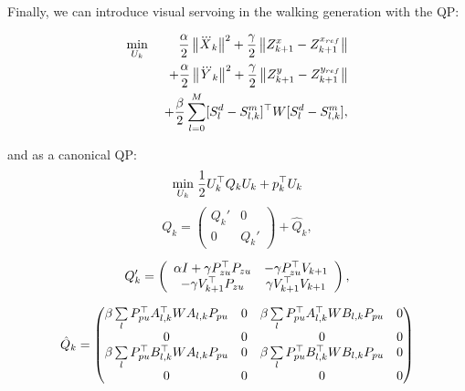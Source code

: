 Finally, we can introduce visual servoing in the walking generation with the QP:

\begin{eqnarray*}
\nonumber
 \min_{U_k} \; && \dfrac{\alpha}{2} \left\| \dddot{X}_k \right\|^2
 + \dfrac{\gamma}{2} \left\| Z_{k+1}^x - Z_{k+1}^{x_{ref}} \right\| \\
 \nonumber
 && + \dfrac{\alpha}{2} \left\| \dddot{Y}_k \right\|^2
 + \dfrac{\gamma}{2} \left\| Z_{k+1}^y - Z_{k+1}^{y_{ref}} \right\| \\
 \nonumber
 && + \dfrac{\beta}{2} \sum\limits_{l=0}^{M}  [S^d_{l}- S^m_{l,k}]^{\top} W [S^d_{l} - S^m_{l,k}],
\end{eqnarray*}

and as a canonical QP:
{\small
\begin{equation*}
\underset{U_k}{\min} \; \dfrac{1}{2} U_k^{\top} Q_k U_k + p_k^{\top} U_k
\end{equation*}
}
{\small
{}
\begin{equation*}
Q_k = \left( \begin{array}{cc}
Q_k' & 0 \\
0 & Q_k'
\end{array}
 \right) + \hat{Q}_k,
\end{equation*}
}

{\scriptsize
\begin{equation*}
 Q_k' = \left(
 \begin{array}{cc}
 \alpha I + \gamma P^{\top}_{zu}P_{zu} & - \gamma P^{\top}_{zu}V_{k+1} \\
 -\gamma V^{\top}_{k+1} P_{zu} & \gamma V^{\top}_{k+1} V_{k+1}
 \end{array}
 \right),
\end{equation*}
}

{\scriptsize
\begin{equation*}
 \hat{Q}_k = \left(
 \begin{matrix}
 \beta \sum\limits_l P_{pu}^{\top} A_{l,k}^{\top} {W} A_{l,k} P_{pu} & 0 & \beta \sum\limits_l P_{pu}^{\top} A_{l,k}^{\top} {W} B_{l,k} P_{pu} & 0\\
 0 & 0 & 0 & 0 \\
 \beta \sum\limits_l P_{pu}^{\top} B_{l,k}^{\top} {W} A_{l,k} P_{pu} & 0 & \beta \sum\limits_l P_{pu}^{\top} B_{l,k}^{\top} {W} B_{l,k} P_{pu} & 0 \\
 0 & 0 & 0 & 0
 \end{matrix}
 \right)
\end{equation*}
}

